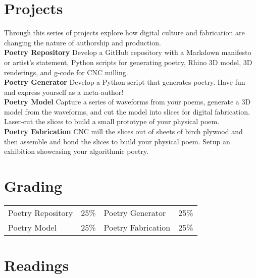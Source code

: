 \documentclass[11pt,article,oneside]{memoir}
\begin{document}
\clearpage

\section{Projects}
Through this series of projects
explore how digital culture and fabrication
are changing the nature of authorship
and production. 
\\

\noindent \textbf{Poetry Repository}
Develop a GitHub repository with 
a Markdown manifesto or artist's statement,
Python scripts for generating poetry,
Rhino 3D model, 3D renderings,
and g-code for CNC milling. \\

\noindent \textbf{Poetry Generator}
Develop a Python script that generates poetry.
Have fun and express yourself as a meta-author! \\

\noindent \textbf{Poetry Model}
Capture a series of waveforms from your poems,
generate a 3D model from the waveforms,
and cut the model into slices for digital fabrication. 
Laser-cut the slices to build a small prototype 
of your physical poem. \\

\noindent \textbf{Poetry Fabrication}
CNC mill the slices out of sheets of birch plywood 
and then assemble and bond the slices
to build your physical poem. 
Setup an exhibition showcasing your algorithmic poetry. \\

\section{Grading}
%
\begin{table}[H]
\begin{tabular}{l r @{\hskip 2.5cm} l r}
%
Poetry Repository & 25\% & 
Poetry Generator & 25\% \\
Poetry Model & 25\% &
Poetry Fabrication & 25\% \\
%
\end{tabular}
\end{table}

\clearpage

\section{Readings}
\renewcommand*{\bibfont}{\normalsize} %
\vspace*{0.5cm}
\nocite{*}
\setlength{}
\printbibliography[heading=none]
\end{document}

